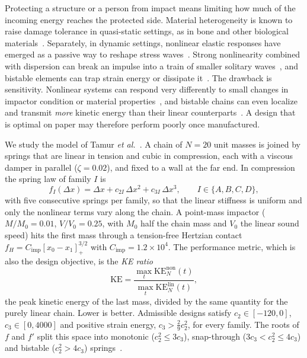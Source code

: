\documentclass[12pt,letterpaper]{article}
\newcommand{\KE}{\mathrm{KE}}
\begin{document}
Protecting a structure or a person from impact means limiting how much of the incoming
energy reaches the protected side. Material heterogeneity is known to raise damage
tolerance in quasi-static settings, as in bone and other biological
materials~\cite{keaveny,wegst}. Separately, in dynamic settings, nonlinear elastic
responses have emerged as a passive way to reshape stress waves~\cite{patil,nesterenko}.
Strong nonlinearity combined with dispersion can break an impulse into a train of
smaller solitary waves~\cite{nesterenko}, and bistable elements can trap strain energy
or dissipate it~\cite{shan,xiu}. The drawback is sensitivity. Nonlinear systems can
respond very differently to small changes in impactor condition or material
properties~\cite{strogatz}, and bistable chains can even localize and transmit
\emph{more} kinetic energy than their linear counterparts~\cite{fancher}. A design that is
optimal on paper may therefore perform poorly once manufactured.

We study the model of Tamur \emph{et al.}~\cite{tamur}. A chain of $N=20$ unit masses is
joined by springs that are linear in tension and cubic in compression, each with a
viscous damper in parallel ($\zeta=0.02$), and fixed to a wall at the far end. In
compression the spring law of family $I$ is
\begin{equation}
  f_I(\Delta x) = \Delta x + c_{2I}\,\Delta x^2 + c_{3I}\,\Delta x^3,
  \qquad I\in\{A,B,C,D\},
  \label{eq:spring}
\end{equation}
with five consecutive springs per family, so that the linear stiffness is uniform and
only the nonlinear terms vary along the chain. A point-mass impactor ($M/M_0=0.01$,
$V/V_0=0.25$, with $M_0$ half the chain mass and $V_0$ the linear sound speed) hits the
first mass through a tension-free Hertzian contact
$f_H = C_\text{imp}[x_0-x_1]_+^{3/2}$ with $C_\text{imp}=1.2\times10^4$. The performance
metric, which is also the design objective, is the \emph{KE ratio}
\begin{equation}
  \KE = \frac{\max_t \KE_{N}^{\text{non}}(t)}{\max_t \KE_{N}^{\text{lin}}(t)},
  \label{eq:ke}
\end{equation}
the peak kinetic energy of the last mass, divided by the same quantity for the purely
linear chain. Lower is better. Admissible designs satisfy
$c_2\in[-120,0]$, $c_3\in[0,4000]$ and positive strain energy,
$c_3 > \tfrac{2}{9}c_2^2$, for every family. The roots of $f$ and $f'$ split this
space into monotonic ($c_2^2\le 3c_3$), snap-through ($3c_3<c_2^2\le 4c_3$) and
bistable ($c_2^2>4c_3$) springs~\cite{tamur}.
\end{document}
